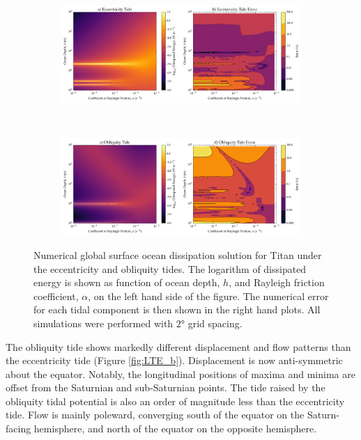 \begin{figure}[!t]
\centering
\begin{subfigure}{0.85\linewidth}
\centering
\includegraphics[width=\linewidth]{Figures/Eccentricity_error}
\subcaption{\label{fig:lincEccTitan}}
\end{subfigure}\\\vspace*{-0.5cm}
\begin{subfigure}{0.85\linewidth}
\centering
\includegraphics[width=\linewidth]{Figures/Obliquity_error}
\subcaption{\label{fig:linObliqTitan}}
\end{subfigure}
\vspace*{-0.8cm}
\caption{Numerical global surface ocean dissipation solution for Titan under the eccentricity and obliquity tides. The logarithm of dissipated energy is shown as function of ocean depth, $h$, and Rayleigh friction coefficient, $\alpha$, on the left hand side of the figure. The numerical error for each tidal component is then shown in the right hand plots. All simulations were performed with $\ang{2}$ grid spacing. \label{fig:linTitan}}
\end{figure}

The obliquity tide shows markedly different displacement and flow patterns than the eccentricity tide (Figure \ref{fig:LTE_b}). Displacement is now anti-symmetric about the equator. Notably, the longitudinal positions of maxima and minima are offset from the Saturnian and sub-Saturnian points. The tide raised by the obliquity tidal potential is also an order of magnitude less than the eccentricity tide. Flow is mainly poleward, converging south of the equator on the Saturn-facing hemisphere, and north of the equator on the opposite hemisphere.

